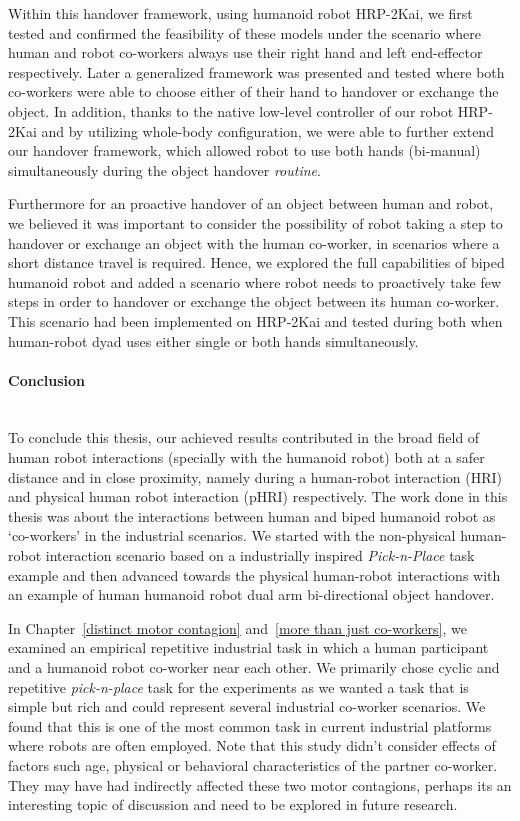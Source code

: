 Within this handover framework, using humanoid robot HRP-2Kai, we first tested and confirmed the feasibility of these models under the scenario where human and robot co-workers always use their right hand and left end-effector respectively. Later a generalized framework was presented and tested where both co-workers were able to choose either of their hand to handover or exchange the object. In addition, thanks to the native low-level controller of our robot HRP-2Kai and by utilizing whole-body configuration, we were able to further extend our handover framework, which allowed robot to use both hands  (bi-manual) simultaneously during the object handover \textit{routine}.

Furthermore for an proactive handover of an object between human and robot, we believed it was important to consider the possibility of robot taking a step to handover or exchange an object with the human co-worker, in scenarios where a short distance travel is required. Hence, we explored the full capabilities of biped humanoid robot and added a scenario where robot needs to proactively take few steps in order to handover or exchange the object between its human co-worker. This scenario had been implemented on HRP-2Kai and tested during both when human-robot dyad uses either single or both hands simultaneously. 


\paragraph*{\LARGE {Conclusion \\}\\}

To conclude this thesis, our achieved results contributed in the broad field of human robot interactions (specially with the humanoid robot) both at a safer distance and in close proximity, namely during a human-robot interaction (HRI) and physical human robot interaction (pHRI) respectively. The work done in this thesis was about the interactions between human and biped humanoid robot as `co-workers' in the industrial scenarios. We started with the non-physical human-robot interaction scenario based on a industrially inspired \textit{Pick-n-Place} task example and then advanced towards the physical human-robot interactions with an example of human humanoid robot dual arm bi-directional object handover.
 
In Chapter~\ref{distinct motor contagion} and~\ref{more than just co-workers}, we examined an empirical repetitive industrial task in which a human participant and a humanoid robot co-worker near each other. We primarily chose cyclic and repetitive \textit{pick-n-place} task for the experiments as we wanted a task that is simple but rich and could represent several industrial co-worker scenarios. We found that this is one of the most common task in current industrial platforms where robots are often employed. Note that this study didn't consider effects of factors such age, physical or behavioral characteristics of the partner co-worker. They may have had indirectly affected these two motor contagions, perhaps its an interesting topic of discussion and need to be explored in future research.

